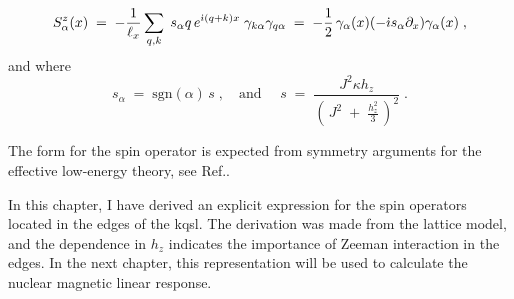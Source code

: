 \begin{equation}
     S^{z}_{\alpha} (x) \;  = \;  -\frac{1}{\ell_x} \sum_{q,k } \;  s_{\alpha} q  \, e^{\dot{\imath} (q+k) x} \;  \gamma_{k\alpha} \gamma_{q\alpha} \; = \;- \frac{1}{2} \, \gamma_{\alpha}(x)  ( - \dot{\imath} s_{\alpha} \partial_x ) \gamma_{\alpha}(x) \; ,  \label{eq:5-Spin}
\end{equation}
and where
\begin{equation}
    s_\alpha \; = \; \text{sgn}(\alpha) \, s \; , \quad \text{and } \quad s \; = \;   \frac{ \; J^2 \kappa h_z \; }{\left( \, J^2 \; + \; \frac{h^2_z}{3} \, \right)^{2} } \; .
    \end{equation}




The form for the spin operator is expected from symmetry arguments for the effective low-energy theory, see Ref.\cite{Aasen_2020}. %


In this chapter, I have derived an explicit expression for the spin operators located in the edges of the \acrshort{kqsl}. The derivation was made from the lattice model, and the dependence in $h_z$ indicates the importance of Zeeman interaction in the edges. In the next chapter, this representation will be used to calculate the nuclear magnetic linear response.
